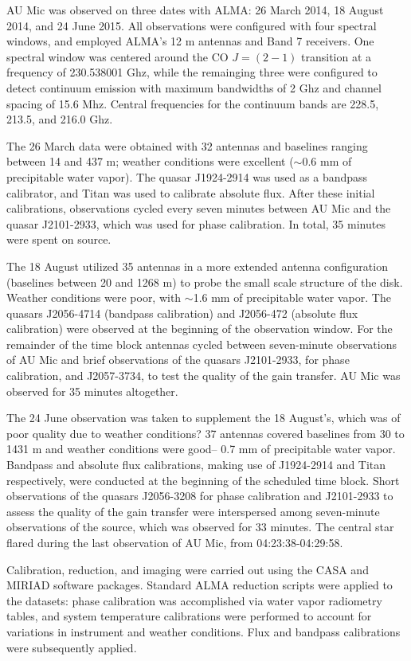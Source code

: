 \documentclass[a4paper]{tufte-handout}
\begin{document}
AU Mic was observed on three dates with ALMA: 26 March 2014, 18 August 2014, and 24 June 2015. All observations were configured with four spectral windows, and employed ALMA's 12 m antennas and Band 7 receivers. One spectral window was centered around the CO $J = (2-1)$ transition at a frequency of 230.538001 Ghz, while the remainging three were configured to detect continuum emission with maximum bandwidths of 2 Ghz and channel spacing of 15.6 Mhz. Central frequencies for the continuum bands are 228.5, 213.5, and 216.0 Ghz.

The 26 March data were obtained with 32 antennas and baselines ranging between  14 and 437 m; weather conditions were excellent ($\sim$0.6 mm of precipitable water vapor). The quasar J1924-2914 was used as a bandpass calibrator, and Titan was used to calibrate absolute flux. After these initial calibrations, observations cycled every seven minutes between AU Mic and the quasar J2101-2933, which was used for phase calibration. In total, 35 minutes were spent on source.

The 18 August utilized 35 antennas in a more extended antenna configuration (baselines between 20 and 1268 m) to probe the small scale structure of the disk. Weather conditions were poor, with $\sim$1.6 mm of precipitable water vapor. The quasars J2056-4714 (bandpass calibration) and J2056-472 (absolute flux calibration) were observed at the beginning of the observation window. For the remainder of the time block antennas cycled between seven-minute observations of AU Mic and brief observations of the quasars J2101-2933, for phase calibration, and J2057-3734, to test the quality of the gain transfer. AU Mic was observed for 35 minutes altogether.

The 24 June observation was taken to supplement the 18 August's, which was of poor quality due to weather conditions? 37 antennas covered baselines from 30 to 1431 m and weather conditions were good-- 0.7 mm of precipitable water vapor. Bandpass and absolute flux calibrations, making use of J1924-2914 and Titan respectively, were conducted at the beginning of the scheduled time block. Short observations of the quasars J2056-3208 for phase calibration and J2101-2933 to assess the quality of the gain transfer were interspersed among seven-minute observations of the source, which was observed for 33 minutes. The central star flared during the last observation of AU Mic, from 04:23:38-04:29:58.

Calibration, reduction, and imaging were carried out using the CASA and MIRIAD software packages. Standard ALMA reduction scripts were applied to the datasets: phase calibration was accomplished via water vapor radiometry tables, and system temperature calibrations were performed to account for variations in instrument and weather conditions. Flux and bandpass calibrations were subsequently applied.
\end{document}
